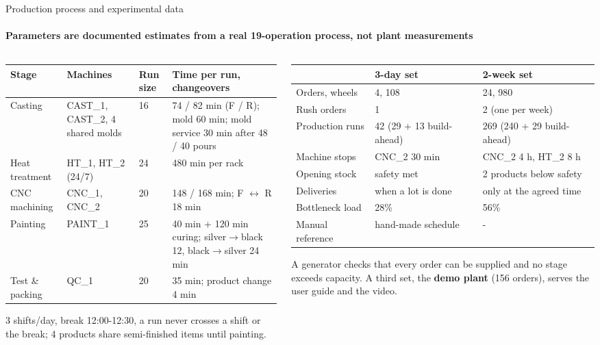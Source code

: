 \begin{frame}{Production process and experimental data}
\framesubtitle{Parameters are documented estimates from a real 19-operation process, not plant measurements}
\begin{columns}[T]
\begin{column}{0.53\textwidth}
\tiny
\setlength{\tabcolsep}{3pt}
\begin{tabular}{@{}L{1.25cm}L{1.55cm}L{0.95cm}L{3.0cm}@{}}
\toprule
Stage & Machines & Run size & Time per run, changeovers\\
\midrule
Casting & CAST\_1, CAST\_2, 4 shared molds & 16 & 74 / 82 min (F / R); mold 60 min; mold service 30 min after 48 / 40 pours\\
Heat treatment & HT\_1, HT\_2 (24/7) & 24 & 480 min per rack\\
CNC machining & CNC\_1, CNC\_2 & 20 & 148 / 168 min; F $\leftrightarrow$ R 18 min\\
Painting & PAINT\_1 & 25 & 40 min + 120 min curing; silver$\to$black 12, black$\to$silver 24 min\\
Test \& packing & QC\_1 & 20 & 35 min; product change 4 min\\
\bottomrule
\end{tabular}
\vspace{0.3em}

\scriptsize 3 shifts/day, break 12:00-12:30, a run never crosses a shift or the break; 4 products share semi-finished items until painting.
\end{column}
\begin{column}{0.44\textwidth}
\tiny
\setlength{\tabcolsep}{3pt}
\begin{tabular}{@{}L{1.7cm}L{1.55cm}L{2.0cm}@{}}
\toprule
 & 3-day set & 2-week set\\
\midrule
Orders, wheels & 4, 108 & 24, 980\\
Rush orders & 1 & 2 (one per week)\\
Production runs & 42 (29 + 13 build-ahead) & 269 (240 + 29 build-ahead)\\
Machine stops & CNC\_2 30 min & CNC\_2 4 h, HT\_2 8 h\\
Opening stock & safety met & 2 products below safety\\
Deliveries & when a lot is done & only at the agreed time\\
Bottleneck load & 28\% & 56\%\\
Manual reference & hand-made schedule & -\\
\bottomrule
\end{tabular}
\vspace{0.3em}

\scriptsize A generator checks that every order can be supplied and no stage exceeds capacity. A third set, the
\textbf{demo plant} (156 orders), serves the user guide and the video.
\end{column}
\end{columns}
\end{frame}

